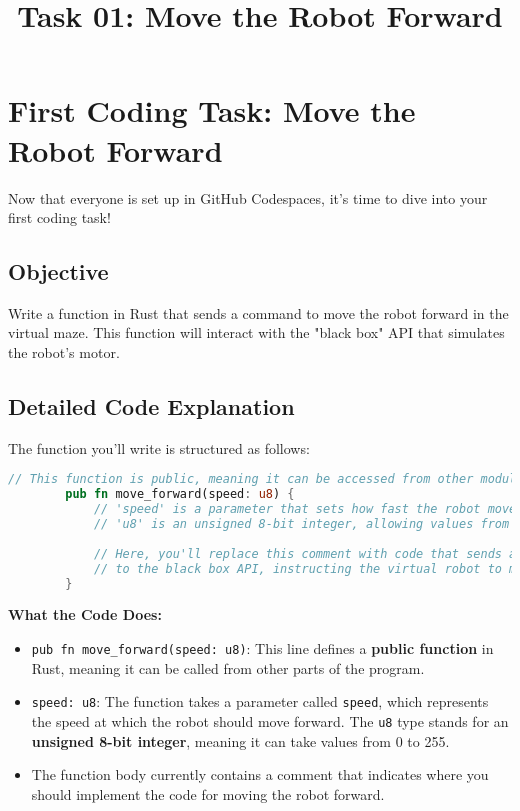 \documentclass{article}
\title{Task 01: Move the Robot Forward}
\author{}
\date{}
\begin{document}
	
	\maketitle
	
	\section*{First Coding Task: Move the Robot Forward}
	
	Now that everyone is set up in GitHub Codespaces, it's time to dive into your first coding task!
	
	\subsection*{Objective}
	Write a function in Rust that sends a command to move the robot forward in the virtual maze. This function will interact with the "black box" API that simulates the robot’s motor.
	
	\subsection*{Detailed Code Explanation}
	
	The function you'll write is structured as follows:
	
	\begin{lstlisting}[language=Rust, caption={Rust code for moving the robot forward}]
		// This function is public, meaning it can be accessed from other modules.
		pub fn move_forward(speed: u8) {
			// 'speed' is a parameter that sets how fast the robot moves forward.
			// 'u8' is an unsigned 8-bit integer, allowing values from 0 to 255.
			
			// Here, you'll replace this comment with code that sends a command 
			// to the black box API, instructing the virtual robot to move forward.
		}
	\end{lstlisting}
	
	\noindent
	\textbf{What the Code Does:}
	\begin{itemize}
		\item \texttt{pub fn move\_forward(speed: u8)}: 
		This line defines a \textbf{public function} in Rust, meaning it can be called from other parts of the program.
		\item \texttt{speed: u8}:
		The function takes a parameter called \texttt{speed}, which represents the speed at which the robot should move forward. 
		The \texttt{u8} type stands for an \textbf{unsigned 8-bit integer}, meaning it can take values from 0 to 255.
		\item The function body currently contains a comment that indicates where you should implement the code for moving the robot forward.
	\end{itemize}
	
\end{document}
